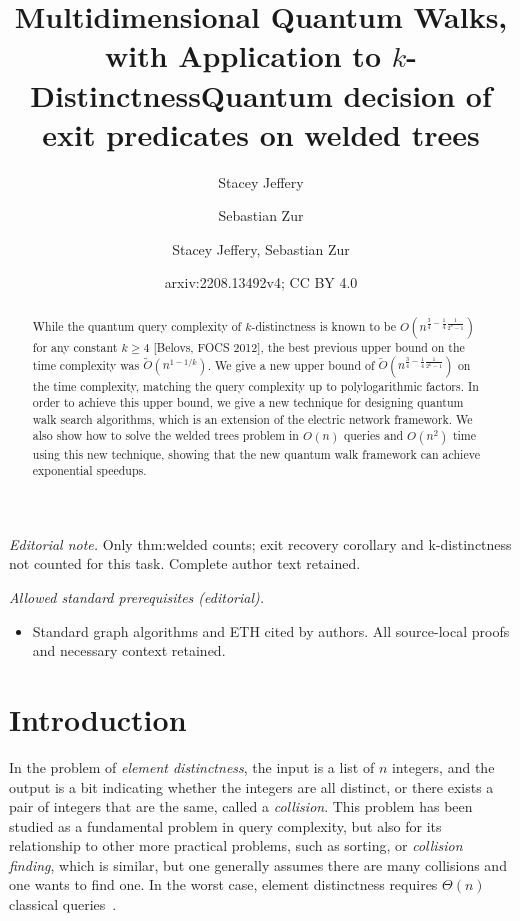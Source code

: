 \documentclass{article}
\author{Stacey Jeffery \and Sebastian Zur}\date{}
\title{Multidimensional Quantum Walks, with Application to \texorpdfstring{$k$}{k}-Distinctness}
\title{Quantum decision of exit predicates on welded trees}
\author{Stacey Jeffery, Sebastian Zur}
\date{arxiv:2208.13492v4; CC BY 4.0}
\renewcommand{\>}{\rangle}
\newcommand{\<}{\langle}
\renewcommand{\(}{\left(}
\renewcommand{\)}{\right)}
\begin{document}
\maketitle
\noindent\textit{Editorial note.} Only thm:welded counts; exit recovery corollary and k-distinctness not counted for this task. Complete author text retained.\par\medskip
\noindent\textit{Allowed standard prerequisites (editorial).}\begin{itemize}
\item Standard graph algorithms and ETH cited by authors. All source-local proofs and necessary context retained.
\end{itemize}\medskip

\maketitle

\begin{abstract}
While the quantum query complexity of $k$-distinctness is known to be $O(n^{\frac{3}{4}-\frac{1}{4}\frac{1}{2^k-1}})$ for any constant $k\geq 4$ [Belovs, FOCS 2012], the best previous upper bound on the time complexity was $\widetilde{O}(n^{1-1/k})$. We give a new upper bound of $\widetilde{O}(n^{\frac{3}{4}-\frac{1}{4}\frac{1}{2^k-1}})$ on the time complexity, matching the query complexity up to polylogarithmic factors. In order to achieve this upper bound, we give a new technique for designing quantum walk search algorithms, which is an extension of the electric network framework. We also show how to solve the welded trees problem in $O(n)$ queries and $O(n^2)$ time using this new technique, showing that the new quantum walk framework can achieve exponential speedups.  
\end{abstract}

 

\section{Introduction}

In the problem of \emph{element distinctness}, the input is a list of $n$ integers, and the output is a bit indicating whether the integers are all distinct, or there exists a pair of integers that are the same, called a \emph{collision}. This problem has been studied as a fundamental problem in query complexity, but also for its relationship to other more practical problems, such as sorting, or \emph{collision finding}, which is similar, but one generally assumes there are many collisions and one wants to find one. In the worst case, element distinctness requires $\Theta(n)$ classical queries~\cite{ajtai2005EDlowerbound}. 
\end{document}
